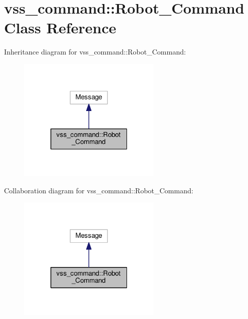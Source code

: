 \hypertarget{classvss__command_1_1Robot__Command}{}\section{vss\+\_\+command\+:\+:Robot\+\_\+\+Command Class Reference}
\label{classvss__command_1_1Robot__Command}


Inheritance diagram for vss\+\_\+command\+:\+:Robot\+\_\+\+Command\+:
\nopagebreak
\begin{figure}[H]
\begin{center}
\leavevmode
\includegraphics[width=193pt]{classvss__command_1_1Robot__Command__inherit__graph}
\end{center}
\end{figure}


Collaboration diagram for vss\+\_\+command\+:\+:Robot\+\_\+\+Command\+:
\nopagebreak
\begin{figure}[H]
\begin{center}
\leavevmode
\includegraphics[width=193pt]{classvss__command_1_1Robot__Command__coll__graph}
\end{center}
\end{figure}

